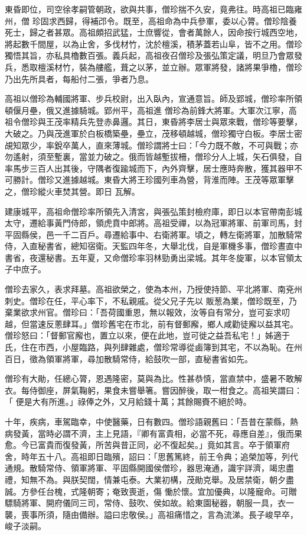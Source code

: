 \begin{pinyinscope}
 東昏即位，司空徐孝嗣管朝政，欲與共事，僧珍揣不久安，竟弗往。時高祖已臨雍州，僧
 珍固求西歸，得補邔令。既至，高祖命為中兵參軍，委以心膂。僧珍陰養死士，歸之者甚眾。高祖頗招武猛，士庶響從，會者萬餘人，因命按行城西空地，將起數千間屋，以為止舍，多伐材竹，沈於檀溪，積茅蓋若山阜，皆不之用。僧珍獨悟其旨，亦私具櫓數百張。義兵起，高祖夜召僧珍及張弘策定議，明旦乃會眾發兵，悉取檀溪材竹，裝為艛艦，葺之以茅，並立辦。眾軍將發，諸將果爭櫓，僧珍乃出先所具者，每船付二張，爭者乃息。



 高祖以僧珍為輔國將軍、步兵校尉，出入臥內，宣通意旨。師及郢城，僧珍率所領頓偃月壘，俄又進據騎城。郢州平，高祖進
 僧珍為前鋒大將軍。大軍次江寧，高祖令僧珍與王茂率精兵先登赤鼻邏。其日，東昏將李居士與眾來戰，僧珍等要擊，大破之。乃與茂進軍於白板橋築壘，壘立，茂移頓越城，僧珍獨守白板。李居士密覘知眾少，率銳卒萬人，直來薄城。僧珍謂將士曰：「今力既不敵，不可與戰；亦勿遙射，須至塹裏，當並力破之。俄而皆越塹拔柵，僧珍分人上城，矢石俱發，自率馬步三百人出其後，守隅者復踰城而下，內外齊擊，居士應時奔散，獲其器甲不可勝計。僧珍又進據越城。東昏大將王珍國列車為營，背淮而陣。王茂等眾軍擊之，僧珍縱火車焚其營。即日
 瓦解。



 建康城平，高祖命僧珍率所領先入清宮，與張弘策封檢府庫，即日以本官帶南彭城太守，遷給事黃門侍郎，領虎賁中郎將。高祖受禪，以為冠軍將軍、前軍司馬，封平固縣侯，邑一千二百戶。尋遷給事中、右衛將軍。頃之，轉左衛將軍，加散騎常侍，入直秘書省，總知宿衛。天監四年冬，大舉北伐，自是軍機多事，僧珍晝直中書省，夜還秘書。五年夏，又命僧珍率羽林勁勇出梁城。其年冬旋軍，以本官領太子中庶子。



 僧珍去家久，表求拜墓。高祖欲榮之，使為本州，乃授使持節、平北將軍、南兗州刺史。僧珍在任，平心率下，不私親戚。從父兄子先以
 販葱為業，僧珍既至，乃棄業欲求州官。僧珍曰：「吾荷國重恩，無以報效，汝等自有常分，豈可妄求叨越，但當速反蔥肆耳。」僧珍舊宅在市北，前有督郵廨，鄉人咸勸徒廨以益其宅。僧珍怒曰：「督郵官廨也，置立以來，便在此地，豈可徙之益吾私宅！」姊適于氏，住在市西，小屋臨路，與列肆雜處，僧珍常導從鹵簿到其宅，不以為恥。在州百日，徵為領軍將軍，尋加散騎常侍，給鼓吹一部，直秘書省如先。



 僧珍有大勛，任總心膂，恩遇隆密，莫與為比。性甚恭慎，當直禁中，盛暑不敢解衣。每侍御座，屏氣鞠躬，果食未嘗舉箸。嘗因醉後，取一柑食之。高祖笑謂曰：「
 便是大有所進。」祿俸之外，又月給錢十萬；其餘賜賚不絕於時。



 十年，疾病，車駕臨幸，中使醫藥，日有數四。僧珍語親舊曰：「吾昔在蒙縣，熱病發黃，當時必謂不濟，主上見語，『卿有富貴相，必當不死，尋應自差』，俄而果愈。今已富貴而復發黃，所苦與昔正同，必不復起矣。」竟如其言。卒于領軍府舍，時年五十八。高祖即日臨殯，詔曰：「思舊篤終，前王令典；追榮加等，列代通規。散騎常侍、領軍將軍、平固縣開國侯僧珍，器思淹通，識宇詳濟，竭忠盡禮，知無不為。與朕契闊，情兼屯泰。大業初構，茂勛克舉。及居禁衛，朝夕盡誠。方參任台槐，式隆朝寄；奄致喪逝，傷
 慟於懷。宜加優典，以隆寵命。可贈驃騎將軍、開府儀同三司，常侍、鼓吹、侯如故。給東園秘器，朝服一具，衣一襲，喪事所須，隨由備辦。謚曰忠敬侯。」高祖痛惜之，言為流涕。長子峻早卒，峻子淡嗣。




\end{pinyinscope}
